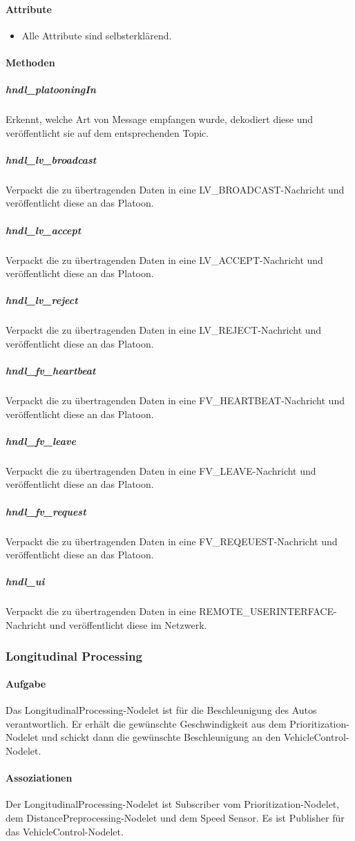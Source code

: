 \documentclass[a4paper, 12pt, titlepage]{scrartcl}
\begin{document}
				\paragraph{Attribute}
				    \begin{itemize}
				        \item Alle Attribute sind selbsterklärend.
				    \end{itemize}
				\paragraph{Methoden}
                    \subparagraph{hndl\_platooningIn} Erkennt, welche Art von Message empfangen wurde, dekodiert diese und veröffentlicht sie auf dem entsprechenden Topic.
					\subparagraph{hndl\_lv\_broadcast} Verpackt die zu übertragenden Daten in eine LV\_BROADCAST-Nachricht und veröffentlicht diese an das Platoon.
					\subparagraph{hndl\_lv\_accept} Verpackt die zu übertragenden Daten in eine LV\_ACCEPT-Nachricht und veröffentlicht diese an das Platoon.
					\subparagraph{hndl\_lv\_reject} Verpackt die zu übertragenden Daten in eine LV\_REJECT-Nachricht und veröffentlicht diese an das Platoon.
                	\subparagraph{hndl\_fv\_heartbeat} Verpackt die zu übertragenden Daten in eine FV\_HEARTBEAT-Nachricht und veröffentlicht diese an das Platoon.
                    \subparagraph{hndl\_fv\_leave} Verpackt die zu übertragenden Daten in eine FV\_LEAVE-Nachricht und veröffentlicht diese an das Platoon.
                	\subparagraph{hndl\_fv\_request} Verpackt die zu übertragenden Daten in eine FV\_REQEUEST-Nachricht und veröffentlicht diese an das Platoon.
                	\subparagraph{hndl\_ui} Verpackt die zu übertragenden Daten in eine REMOTE\_USERINTERFACE-Nachricht und veröffentlicht diese im Netzwerk.

			\subsubsection{Longitudinal Processing}
			\label{longitudinal_processing}
				\paragraph{Aufgabe} Das LongitudinalProcessing-Nodelet ist für die Beschleunigung des Autos verantwortlich. Er erhält die gewünschte Geschwindigkeit aus dem Prioritization-Nodelet und schickt dann die gewünschte Beschleunigung an den VehicleControl-Nodelet.
				\paragraph{Assoziationen} Der LongitudinalProcessing-Nodelet ist Subscriber vom Prioritization-Nodelet, dem DistancePreprocessing-Nodelet und dem Speed Sensor. Es ist Publisher für das VehicleControl-Nodelet.
\end{document}
